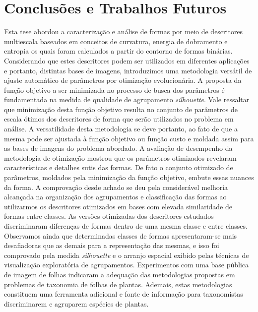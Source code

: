 \chapter{Conclusões e Trabalhos Futuros \label{chap:ch5}}

Esta tese abordou a caracterização e análise de formas por meio de descritores multiescala baseados em conceitos de curvatura, energia de dobramento e entropia os quais foram calculados a partir do contorno de formas binárias. Considerando que estes descritores podem ser utilizados em diferentes aplicações e portanto, distintas bases de imagens, introduzimos uma metodologia versátil de ajuste automático de parâmetros por otimização evolucionária.
A proposta da função objetivo a ser minimizada no processo de busca dos parâmetros é fundamentada na medida de qualidade de agrupamento \textit{silhouette}. Vale ressaltar que minimização desta função objetivo resulta no conjunto de parâmetros de escala ótimos dos descritores de forma que serão utilizados no problema em análise. A versatilidade desta metodologia se deve portanto, ao fato de que a mesma pode ser ajustada à  função  objetivo ou função custo e moldada assim para as bases de imagens do problema abordado.
A avaliação de desempenho da metodologia de otimização mostrou que os parâmetros otimizados revelaram características e detalhes sutis das formas. De fato o conjunto otimizado de parâmetros, moldados pela minimização da função objetivo,  embute essas nuances da forma. A comprovação desde achado se deu pela considerável melhoria alcançada na organização dos agrupamentos e classificação das formas ao utilizarmos os descritores otimizados em bases com elevada similaridade de formas entre classes. As versões otimizadas dos descritores estudados discriminaram diferenças de formas dentro de uma mesma classe e entre classes.  
Observamos ainda que determinadas classes de formas apresentaram-se mais desafiadoras que as demais para a representação das mesmas, e isso foi comprovado pela medida \textit{silhouette}  e o arranjo espacial exibido pelas técnicas de visualização exploratória de agrupamentos.
Experimentos com uma base pública de imagem de folhas indicaram a adequação das metodologias propostas em problemas de taxonomia de folhas de plantas.
Ademais, estas metodologias constituem uma ferramenta adicional e fonte de informação para taxonomistas discriminarem e agruparem espécies de plantas. 


